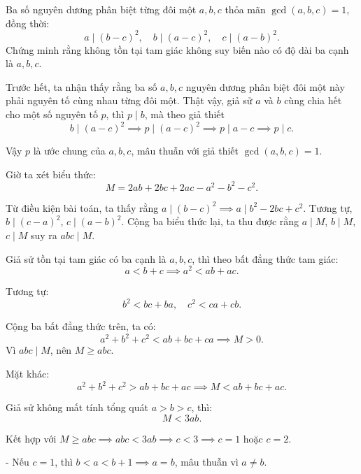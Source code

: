 \ifshowproblemandsoln
\ifshowproblem\begin{problem}[\gls{BW 2015}/P19]\label{problem:BW-2015-P19}\fi
\ifshowsoln\begin{problem}\fi
    Ba số nguyên dương phân biệt từng đôi một \( a, b, c \) thỏa mãn \( \gcd(a,b,c) = 1 \), đồng thời:
    \[
        a \mid (b - c)^2,\quad b \mid (a - c)^2,\quad c \mid (a - b)^2.
    \]
    Chứng minh rằng không tồn tại tam giác không suy biến nào có độ dài ba cạnh là \( a, b, c \).
\end{problem}
\fi

\ifshowsoln
\begin{soln}\footnotemark
    Trước hết, ta nhận thấy rằng ba số \( a, b, c \) nguyên dương phân biệt đôi một này phải nguyên tố cùng nhau từng đôi một.
    Thật vậy, giả sử \( a \) và \( b \) cùng chia hết cho một số nguyên tố \( p \), thì \( p \mid b \), mà theo giả thiết 
    \[ b \mid (a - c)^2 \implies p \mid (a - c)^2 \implies p \mid a - c \implies p \mid c. \]
    
    Vậy \( p \) là ước chung của \( a, b, c \), mâu thuẫn với giả thiết \( \gcd(a, b, c) = 1 \).

    Giờ ta xét biểu thức:
    \[
        M = 2ab + 2bc + 2ac - a^2 - b^2 - c^2.
    \]
    
    Từ điều kiện bài toán, ta thấy rằng \( a \mid (b - c)^2 \implies a \mid b^2 - 2bc + c^2 \). Tương tự, \( b \mid (c - a)^2 \), \( c \mid (a - b)^2 \).
    Cộng ba biểu thức lại, ta thu được rằng \( a \mid M \), \( b \mid M \), \( c \mid M \) suy ra \( abc \mid M \).

    Giả sử tồn tại tam giác có ba cạnh là \( a, b, c \), thì theo bất đẳng thức tam giác:
    \[
        a < b + c \implies a^2 < ab + ac.
    \]

    Tương tự:
    \[
        b^2 < bc + ba,\quad c^2 < ca + cb.
    \]

    Cộng ba bất đẳng thức trên, ta có:
    \[
        a^2 + b^2 + c^2 < ab + bc + ca \implies M > 0.
    \]
    Vì \( abc \mid M \), nên \( M \ge abc \).

    Mặt khác:
    \[
        a^2 + b^2 + c^2 > ab + bc + ac \implies M < ab + bc + ac.
    \]

    Giả sử không mất tính tổng quát \( a > b > c \), thì:
    \[
        M < 3ab.
    \]

    Kết hợp với \( M \ge abc \implies abc < 3ab \implies c < 3 \implies c = 1 \text{ hoặc } c = 2 \).

    - Nếu \( c = 1 \), thì \( b < a < b + 1 \implies a = b \), mâu thuẫn vì \( a \ne b \).


\end{soln}
\end{problem}
